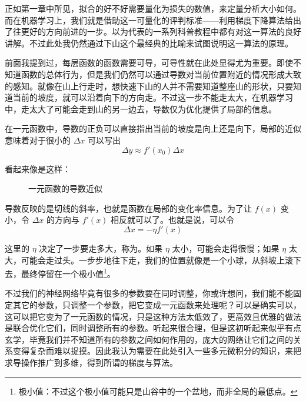 正如第一章中所见，拟合的好不好需要量化为损失的数值，来定量分析大小如何。而在机器学习上，我们就是借助这一可量化的评判标准——利用梯度下降算法给出了往更好的方向前进的一步。以为代表的一系列科普教程中都有对这一算法的良好讲解。不过此处我仍然通过下山这个最经典的比喻来试图说明这一算法的原理。

前面我提到过，每层函数的函数需要可导，可导性就在此处显得尤为重要。即使不知道函数的总体行为，但是我们仍然可以通过导数对当前位置附近的情况形成大致的感知。就像在山上行走时，想快速下山的人并不需要知道整座山的形状，只要知道当前的坡度，就可以沿着向下的方向走。不过这一步不能走太大，在机器学习中，走太大了可能会走到山的另一边去，导数仅为优化提供了局部的信息。

在一元函数中，导数的正负可以直接指出当前的坡度是向上还是向下，局部的近似意味着对于很小的 $\Delta x$ 可以写出
\[
    \Delta y \approx f'(x_0)\Delta x
\]

看起来像是这样：
\begin{figure}[H]
    \centering
    \caption{一元函数的导数近似}
\end{figure}

导数反映的是切线的斜率，也就是函数在局部的变化率信息。为了让 $f(x)$ 变小，令 $\Delta x$ 的方向与 $f'(x)$ 相反就可以了。也就是说，可以令
\[
    \Delta x = -\eta f'(x)
\]

这里的 $\eta$ 决定了一步要走多大，称为。如果 $\eta$ 太小，可能会走得很慢；如果 $\eta$ 太大，可能会走过头。一步步地往下走，我们的位置就像是一个小球，从斜坡上滚下去，最终停留在一个极小值\footnote{极小值：不过这个极小值可能只是山谷中的一个盆地，而非全局的最低点。}。

不过我们的神经网络毕竟有很多的参数要在同时调整，你或许想问，我们能不能固定其它的参数，只调整一个参数，把它变成一元函数来处理呢？可以是确实可以，这可以把它变为了一元函数的情况，只是这种方法太低效了，更高效且优雅的做法是联合优化它们，同时调整所有的参数。听起来很合理，但是这初听起来似乎有点玄学，毕竟我们并不知道所有的参数之间如何作用的，庞大的网络让它们之间的关系变得复杂而难以捉摸。因此我认为需要在此处引入一些多元微积分的知识，来把求导操作推广到多维，得到所谓的梯度与算法。

